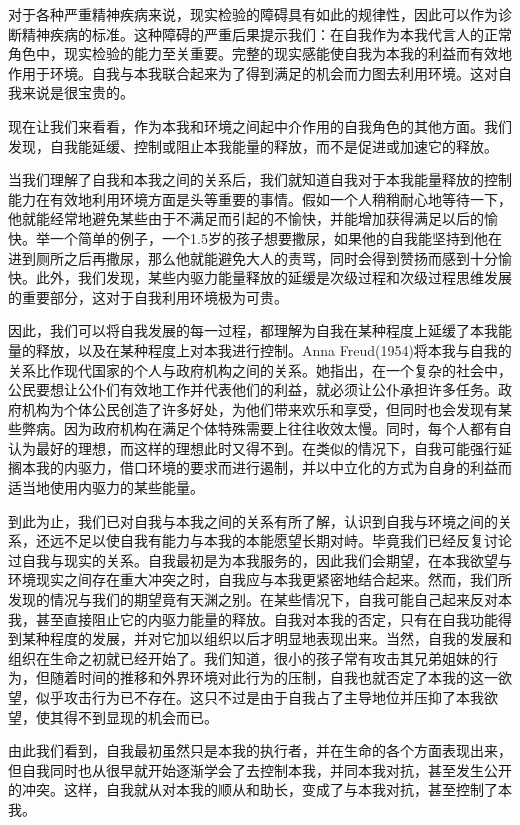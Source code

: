 \documentclass[UTF8,10pt,a4paper,openany]{book}
\begin{document}
对于各种严重精神疾病来说，现实检验的障碍具有如此的规律性，因此可以作为诊断精神疾病的标准。这种障碍的严重后果提示我们：在自我作为本我代言人的正常角色中，现实检验的能力至关重要。完整的现实感能使自我为本我的利益而有效地作用于环境。自我与本我联合起来为了得到满足的机会而力图去利用环境。这对自我来说是很宝贵的。

现在让我们来看看，作为本我和环境之间起中介作用的自我角色的其他方面。我们发现，自我能延缓、控制或阻止本我能量的释放，而不是促进或加速它的释放。

当我们理解了自我和本我之间的关系后，我们就知道自我对于本我能量释放的控制能力在有效地利用环境方面是头等重要的事情。假如一个人稍稍耐心地等待一下，他就能经常地避免某些由于不满足而引起的不愉快，并能增加获得满足以后的愉快。举一个简单的例子，一个1.5岁的孩子想要撒尿，如果他的自我能坚持到他在进到厕所之后再撒尿，那么他就能避免大人的责骂，同时会得到赞扬而感到十分愉快。此外，我们发现，某些内驱力能量释放的延缓是次级过程和次级过程思维发展的重要部分，这对于自我利用环境极为可贵。

因此，我们可以将自我发展的每一过程，都理解为自我在某种程度上延缓了本我能量的释放，以及在某种程度上对本我进行控制。Anna Freud(1954)将本我与自我的关系比作现代国家的个人与政府机构之间的关系。她指出，在一个复杂的社会中，公民要想让公仆们有效地工作并代表他们的利益，就必须让公仆承担许多任务。政府机构为个体公民创造了许多好处，为他们带来欢乐和享受，但同时也会发现有某些弊病。因为政府机构在满足个体特殊需要上往往收效太慢。同时，每个人都有自认为最好的理想，而这样的理想此时又得不到。在类似的情况下，自我可能强行延搁本我的内驱力，借口环境的要求而进行遏制，并以中立化的方式为自身的利益而适当地使用内驱力的某些能量。

到此为止，我们已对自我与本我之间的关系有所了解，认识到自我与环境之间的关系，还远不足以使自我有能力与本我的本能愿望长期对峙。毕竟我们已经反复讨论过自我与现实的关系。自我最初是为本我服务的，因此我们会期望，在本我欲望与环境现实之间存在重大冲突之时，自我应与本我更紧密地结合起来。然而，我们所发现的情况与我们的期望竟有天渊之别。在某些情况下，自我可能自己起来反对本我，甚至直接阻止它的内驱力能量的释放。自我对本我的否定，只有在自我功能得到某种程度的发展，并对它加以组织以后才明显地表现出来。当然，自我的发展和组织在生命之初就已经开始了。我们知道，很小的孩子常有攻击其兄弟姐妹的行为，但随着时间的推移和外界环境对此行为的压制，自我也就否定了本我的这一欲望，似乎攻击行为已不存在。这只不过是由于自我占了主导地位并压抑了本我欲望，使其得不到显现的机会而已。

由此我们看到，自我最初虽然只是本我的执行者，并在生命的各个方面表现出来，但自我同时也从很早就开始逐渐学会了去控制本我，并同本我对抗，甚至发生公开的冲突。这样，自我就从对本我的顺从和助长，变成了与本我对抗，甚至控制了本我。
\end{document}
